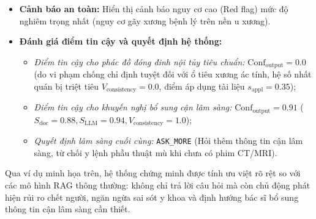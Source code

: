 \begin{enumerate}
\begin{itemize}
        \item \textbf{Cảnh báo an toàn:} Hiển thị cảnh báo nguy cơ cao (Red flag) mức độ nghiêm trọng nhất (nguy cơ gãy xương bệnh lý trên nền u xương).
        \item \textbf{Đánh giá điểm tin cậy và quyết định hệ thống:}
        \begin{itemize}
            \item \emph{Điểm tin cậy cho phác đồ đóng đinh nội tủy tiêu chuẩn:} $\mathrm{Conf}_{\mathrm{output}} = 0.0$ (do vi phạm chống chỉ định tuyệt đối với ổ tiêu xương ác tính, hệ số nhất quán bị triệt tiêu $V_{\mathrm{consistency}} = 0.0$, điểm áp dụng tài liệu $s_{\mathrm{appl}} = 0.35$);
            \item \emph{Điểm tin cậy cho khuyến nghị bổ sung cận lâm sàng:} $\mathrm{Conf}_{\mathrm{output}} = 0.91$ ($S_{\mathrm{doc}} = 0.88, S_{\mathrm{LLM}} = 0.94, V_{\mathrm{consistency}} = 1.0$);
            \item \emph{Quyết định lâm sàng cuối cùng:} \texttt{ASK\_MORE} (Hỏi thêm thông tin cận lâm sàng, từ chối y lệnh phẫu thuật mù khi chưa có phim CT/MRI).
        \end{itemize}
    \end{itemize}
\end{enumerate}

Qua ví dụ minh họa trên, hệ thống chứng minh được tính ưu việt rõ rệt so với các mô hình RAG thông thường: không chỉ trả lời câu hỏi mà còn chủ động phát hiện rủi ro chết người, ngăn ngừa sai sót y khoa và định hướng bác sĩ bổ sung thông tin cận lâm sàng cần thiết.
